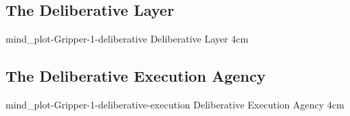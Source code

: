 {\clearpage
  \subsection{The Deliberative Layer}
  \experimentcausegroupplots{\dataappendixmaxtime}
                            {\dataappendixexperimentonemaxtime}
                            {\dataappendixexperimenttwomaxtime}
                            {\dataappendixexperimentthreemaxtime}
                            {\dataappendixexperimentonename}
                            {\dataappendixexperimenttwoname}
                            {\dataappendixexperimentthreename}
                            {\dataappendixexperimentoneprettyname}
                            {\dataappendixexperimenttwoprettyname}
                            \experimentcausegroupplotscontinued{\dataappendixexperimentthreeprettyname}
                                                               {mind_plot-Gripper-1-deliberative}
                                                               {Deliberative Layer}
                                                               {\experimentdatacommontablereference}
                                                               {4cm}
}                                                                 
{\clearpage
  \subsection{The Deliberative Execution Agency}
  \experimentcausegroupplots{\dataappendixmaxtime}
                            {\dataappendixexperimentonemaxtime}
                            {\dataappendixexperimenttwomaxtime}
                            {\dataappendixexperimentthreemaxtime}
                            {\dataappendixexperimentonename}
                            {\dataappendixexperimenttwoname}
                            {\dataappendixexperimentthreename}
                            {\dataappendixexperimentoneprettyname}
                            {\dataappendixexperimenttwoprettyname}
                            \experimentcausegroupplotscontinued{\dataappendixexperimentthreeprettyname}
                                                               {mind_plot-Gripper-1-deliberative-execution}
                                                               {Deliberative Execution Agency}
                                                               {\experimentdatacommontablereference}
                                                               {4cm}
}
